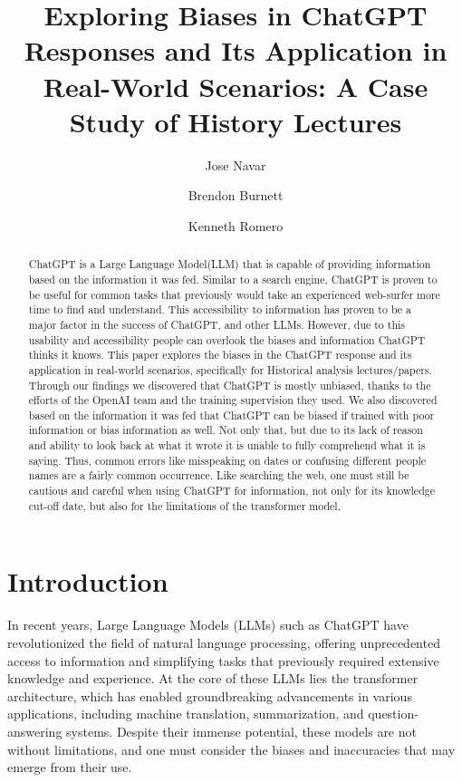 \documentclass[letterpaper, 10pt, conference]{ieeeconf}
\title{\LARGE \bf
Exploring Biases in ChatGPT Responses and Its Application in Real-World Scenarios: A Case Study of History Lectures
}
\author[1]{Jose Navar}
\author[1]{Brendon Burnett}
\author[1]{Kenneth Romero}
\affil[1]{\emph{University of North Georgia}}
\begin{document}
    \maketitle
    \begin{abstract}
        ChatGPT is a Large Language Model(LLM) that is capable of providing information based on the information it was fed. Similar to a search engine, ChatGPT is proven to be useful for common tasks that previously would take an experienced web-surfer more time to find and understand. This accessibility to information has proven to be a major factor in the success of ChatGPT, and other LLMs. However, due to this usability and accessibility people can overlook the biases and information ChatGPT thinks it knows. This paper explores the biases in the ChatGPT response and its application in real-world scenarios, specifically for Historical analysis lectures/papers. Through our findings we discovered that ChatGPT is mostly unbiased, thanks to the efforts of the OpenAI team and the training supervision they used. We also discovered based on the information it was fed that ChatGPT can be biased if trained with poor information or bias information as well. Not only that, but due to its lack of reason and ability to look back at what it wrote it is unable to fully comprehend what it is saying. Thus, common errors like misspeaking on dates or confusing different people names are a fairly common occurrence. Like searching the web, one must still be cautious and careful when using ChatGPT for information, not only for its knowledge cut-off date, but also for the limitations of the transformer model.
    \end{abstract}

    \section{Introduction}
    In recent years, Large Language Models (LLMs) such as ChatGPT have revolutionized the field of natural language processing, offering unprecedented access to information and simplifying tasks that previously required extensive knowledge and experience. At the core of these LLMs lies the transformer architecture, which has enabled groundbreaking advancements in various applications, including machine translation, summarization, and question-answering systems. Despite their immense potential, these models are not without limitations, and one must consider the biases and inaccuracies that may emerge from their use.
\end{document}
